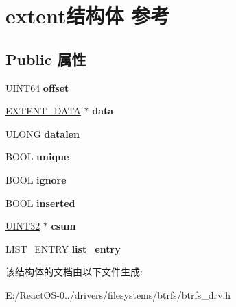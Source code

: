 \hypertarget{structextent}{}\section{extent结构体 参考}
\label{structextent}
\subsection*{Public 属性}
\begin{DoxyCompactItemize}
\item 
\mbox{\label{structextent_a213ca3bc9cacee990729f742a3b291a4}} 
\hyperlink{_processor_bind_8h_a57be03562867144161c1bfee95ca8f7c}{U\+I\+N\+T64} {\bfseries offset}
\item 
\mbox{\label{structextent_a1bcf92e4af9c348a41b302b7ad106ee6}} 
\hyperlink{struct_e_x_t_e_n_t___d_a_t_a}{E\+X\+T\+E\+N\+T\+\_\+\+D\+A\+TA} $\ast$ {\bfseries data}
\item 
\mbox{\label{structextent_a7df61454d5f3dd26ef76f2901c8e2153}} 
U\+L\+O\+NG {\bfseries datalen}
\item 
\mbox{\label{structextent_a150b655390f26e0317842ff6724e84bb}} 
B\+O\+OL {\bfseries unique}
\item 
\mbox{\label{structextent_adfd8336f59746c39b77ae6034cbb0289}} 
B\+O\+OL {\bfseries ignore}
\item 
\mbox{\label{structextent_a3ed5b19412d84147228e21ec92f6fe5d}} 
B\+O\+OL {\bfseries inserted}
\item 
\mbox{\label{structextent_a571d6956258b471b49817030e04c23c3}} 
\hyperlink{_processor_bind_8h_ae1e6edbbc26d6fbc71a90190d0266018}{U\+I\+N\+T32} $\ast$ {\bfseries csum}
\item 
\mbox{\label{structextent_a4409c08c32feb467c154f5c41355d780}} 
\hyperlink{struct___l_i_s_t___e_n_t_r_y}{L\+I\+S\+T\+\_\+\+E\+N\+T\+RY} {\bfseries list\+\_\+entry}
\end{DoxyCompactItemize}


该结构体的文档由以下文件生成\+:\begin{DoxyCompactItemize}
\item 
E\+:/\+React\+O\+S-\/0../drivers/filesystems/btrfs/btrfs\+\_\+drv.\+h\end{DoxyCompactItemize}
